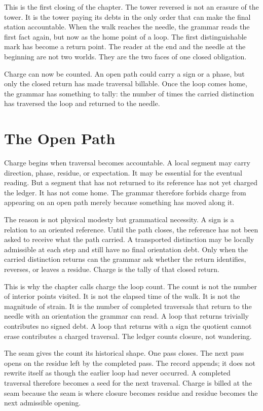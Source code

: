 This is the first closing of the chapter. The tower reversed is not an
erasure of the tower. It is the tower paying its debts in the only order that
can make the final station accountable. When the walk reaches the needle,
the grammar reads the first fact again, but now as the home point of a loop.
The first distinguishable mark has become a return point. The reader at the
end and the needle at the beginning are not two worlds. They are the two
faces of one closed obligation.

Charge can now be counted. An open path could carry a sign or a phase, but
only the closed return has made traversal billable. Once the loop comes home,
the grammar has something to tally: the number of times the carried
distinction has traversed the loop and returned to the needle.

\section{The Open Path}

Charge begins when traversal becomes accountable. A local segment may carry
direction, phase, residue, or expectation. It may be essential for the
eventual reading. But a segment that has not returned to its reference has
not yet charged the ledger. It has not come home. The grammar therefore
forbids charge from appearing on an open path merely because something has
moved along it.

The reason is not physical modesty but grammatical necessity. A sign is a
relation to an oriented reference. Until the path closes, the reference has
not been asked to receive what the path carried. A transported distinction
may be locally admissible at each step and still have no final orientation
debt. Only when the carried distinction returns can the grammar ask whether
the return identifies, reverses, or leaves a residue. Charge is the tally of
that closed return.

This is why the chapter calls charge the loop count. The count is not the
number of interior points visited. It is not the elapsed time of the walk. It
is not the magnitude of strain. It is the number of completed traversals that
return to the needle with an orientation the grammar can read. A loop that
returns trivially contributes no signed debt. A loop that returns with a sign
the quotient cannot erase contributes a charged traversal. The ledger counts
closure, not wandering.

The seam gives the count its historical shape. One pass closes. The next
pass opens on the residue left by the completed pass. The record appends; it
does not rewrite itself as though the earlier loop had never occurred. A
completed traversal therefore becomes a seed for the next traversal. Charge
is billed at the seam because the seam is where closure becomes residue and
residue becomes the next admissible opening.

